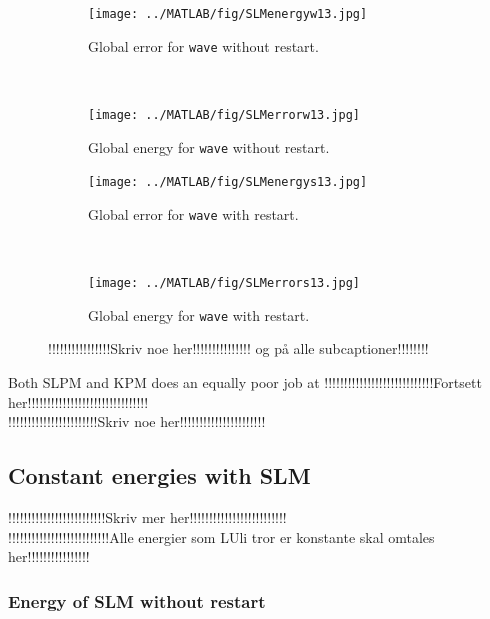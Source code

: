\begin{figure}[H]
        \centering
        \begin{subfigure}[b]{0.45\textwidth}
                \texttt{[image: ../MATLAB/fig/SLMenergyw13.jpg]}
                \caption{Global error for \texttt{wave} without restart.}
                \label{fig:SLMenergyw1}
        \end{subfigure}
        ~
        \begin{subfigure}[b]{0.45\textwidth}
                \texttt{[image: ../MATLAB/fig/SLMerrorw13.jpg]}
                \caption{Global energy for \texttt{wave} without restart.}
                \label{fig:SLMerrorw1}
        \end{subfigure}
        
        \begin{subfigure}[b]{0.45\textwidth}
                \texttt{[image: ../MATLAB/fig/SLMenergys13.jpg]}
                \caption{Global error for \texttt{wave} with restart.}
                \label{fig:SLMenergys1}
        \end{subfigure}
		~
        \begin{subfigure}[b]{0.45\textwidth}
                \texttt{[image: ../MATLAB/fig/SLMerrors13.jpg]}
                \caption{Global energy for \texttt{wave} with restart.}
                \label{fig:SLMerrors1}
        \end{subfigure}
        \caption{!!!!!!!!!!!!!!!!Skriv noe her!!!!!!!!!!!!!!! og på alle subcaptioner!!!!!!!!}
        \label{fig:SLMenergyerror1}
\end{figure}

Both SLPM and KPM does an equally poor job at 
!!!!!!!!!!!!!!!!!!!!!!!!!!!!Fortsett her!!!!!!!!!!!!!!!!!!!!!!!!!!!!!!!\\

!!!!!!!!!!!!!!!!!!!!!!!Skriv noe her!!!!!!!!!!!!!!!!!!!!!!\\

\subsection{Constant energies with SLM} %
!!!!!!!!!!!!!!!!!!!!!!!!!Skriv mer her!!!!!!!!!!!!!!!!!!!!!!!!!\\
!!!!!!!!!!!!!!!!!!!!!!!!!!Alle energier som LUli tror er konstante skal omtales her!!!!!!!!!!!!!!!!\\


\subsubsection{Energy of SLM without restart}%


